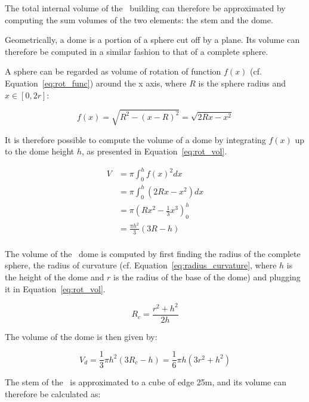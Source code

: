The total internal volume of the \pdome\ building can therefore be approximated
by computing the sum volumes of the two elements: the stem and the dome.

Geometrically, a dome is a portion of a sphere cut off by a plane. Its volume
can therefore be computed in a similar fashion to that of a complete sphere.

A sphere can be regarded as volume of rotation of function $f(x)$ (cf.
Equation~\ref{eq:rot_func}) around the x axis, where $R$ is the sphere radius
and $x \in [0, 2r]$: 

\begin{equation}\label{eq:rot_func}
    f(x) = \sqrt{R^2 - (x-R)^2} = \sqrt{2Rx - x^2}
\end{equation}

It is therefore possible to compute the volume of a dome by integrating $f(x)$
up to the dome height $h$, as presented in Equation~\ref{eq:rot_vol}. 

\begin{equation}\label{eq:rot_vol}
    \begin{aligned}
        V &= \pi \int_0^h f(x)^2 dx \\
          &= \pi \int_0^h (2Rx - x^2)dx \\
          &= \pi \left( Rx^2 - \frac{1}{3}x^3 \right)_0^h \\
          &= \frac{\pi h^2}{3} (3R - h) \\
    \end{aligned}
\end{equation}

The volume of the \pdome\ dome is computed  by first finding the radius of the
complete sphere, the radius of curvature (cf.
Equation~\ref{eq:radius_curvature}, where $h$ is the height of the dome and $r$
is the radius of the base of the dome) and plugging it in
Equation~\ref{eq:rot_vol}.

\begin{equation}\label{eq:radius_curvature}
    R_c = \frac{r^2 + h^2}{2h}
\end{equation}

The volume of the dome is then given by: 

\begin{equation}
    V_d = \frac{1}{3} \pi h^2 (3R_c - h) = \frac{1}{6} \pi h (3r^2 + h^2)
\end{equation}

The stem of the \pdome\ is approximated to a cube of edge 25m, and its volume can
therefore be calculated as: 

